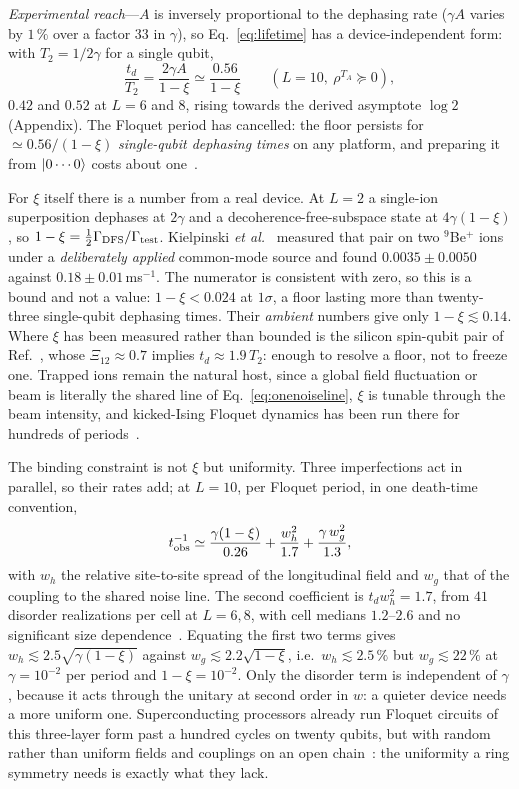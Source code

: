 \documentclass[aps,prl,reprint,amsmath,amssymb,floatfix]{revtex4-2}
\begin{document}
{\it Experimental reach}---$A$ is inversely proportional to the dephasing rate
($\gamma A$ varies by $1\,\%$ over a factor $33$ in $\gamma$), so
Eq.~\eqref{eq:lifetime} has a device-independent form: with $T_2=1/2\gamma$ for
a single qubit,
\begin{equation}
\label{eq:tdT2}
\frac{t_d}{T_2}=\frac{2\gamma A}{1-\xi}\simeq\frac{0.56}{1-\xi}
\qquad(L=10,\ \rho^{T_A}\succeq0),
\end{equation}
$0.42$ and $0.52$ at $L=6$ and $8$, rising towards the derived asymptote
$\log2$ (Appendix). The Floquet period has cancelled: the floor persists for
$\simeq0.56/(1-\xi)$ \emph{single-qubit dephasing times} on any platform, and
preparing it from $\ket{0\cdots0}$ costs about one~\cite{SM}.

For $\xi$ itself there is a number from a real device. At $L=2$ a single-ion
superposition dephases at $2\gamma$ and a decoherence-free-subspace state at
$4\gamma(1-\xi)$, so $1-\xi=\tfrac12\Gamma_{\rm DFS}/\Gamma_{\rm test}$.
Kielpinski \emph{et al.}~\cite{Kielpinski2001} measured that pair on two
$^9$Be$^+$ ions under a \emph{deliberately applied} common-mode source and
found $0.0035\pm0.0050$ against $0.18\pm0.01\,$ms$^{-1}$. The numerator is
consistent with zero, so this is a bound and not a value: $1-\xi<0.024$ at
$1\sigma$, a floor lasting more than twenty-three single-qubit dephasing times.
Their \emph{ambient} numbers give only $1-\xi\lesssim0.14$. Where $\xi$ has
been measured rather than bounded is the silicon spin-qubit pair of
Ref.~\cite{Yoneda2023}, whose $\Xi_{12}\approx0.7$ implies $t_d\approx1.9\,T_2$:
enough to resolve a floor, not to freeze one. Trapped ions remain the natural
host, since a global field fluctuation or beam is literally the shared line of
Eq.~\eqref{eq:onenoiseline}, $\xi$ is tunable through the beam intensity, and
kicked-Ising Floquet dynamics has been run there for hundreds of
periods~\cite{Kyprianidis2021}.

The binding constraint is not $\xi$ but uniformity. Three imperfections act in
parallel, so their rates add; at $L=10$, per Floquet period, in one death-time
convention,
\begin{equation}
\label{eq:budget}
t_{\rm obs}^{-1}\simeq\frac{\gamma(1-\xi)}{0.26}+\frac{w_h^2}{1.7}
+\frac{\gamma\,w_g^2}{1.3},
\end{equation}
with $w_h$ the relative site-to-site spread of the longitudinal field and $w_g$
that of the coupling to the shared noise line. The second coefficient is
$t_dw_h^2=1.7$, from $41$ disorder realizations per cell at $L=6,8$, with cell
medians $1.2$--$2.6$ and no significant size dependence~\cite{SM}. Equating the first two terms gives
$w_h\lesssim2.5\sqrt{\gamma(1-\xi)}$ against $w_g\lesssim2.2\sqrt{1-\xi}$, i.e.\
$w_h\lesssim2.5\,\%$ but $w_g\lesssim22\,\%$ at $\gamma=10^{-2}$ per period and
$1-\xi=10^{-2}$. Only the disorder term is independent of $\gamma$, because it
acts through the unitary at second order in $w$: a quieter device needs a more
uniform one. Superconducting processors already run Floquet circuits of this
three-layer form past a hundred cycles on twenty qubits, but with random rather
than uniform fields and couplings on an open chain~\cite{Mi2022}: the
uniformity a ring symmetry needs is exactly what they lack.
\end{document}
